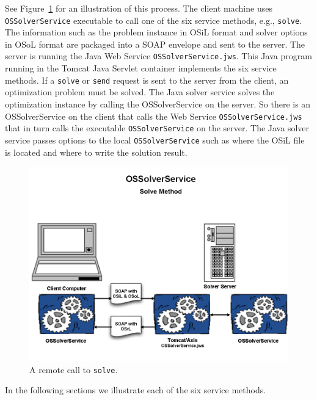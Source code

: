 \documentclass[11pt]{article}
\newcommand{\figurepath}{./figures}
\newcounter{Fig}
\renewcommand{\_}{{\char"5F}}
\renewcommand{\{}{{\char"7B}}
\renewcommand{\}}{{\char"7D}}
\renewcommand{\^}{{\char"0D}}
\renewcommand{\'}{{\char"0D}}
\begin{document}
\begin{enumerate}[Step 1:]
See Figure~\ref{figure:ossolverservice} for an illustration of this process.
The client machine uses {\tt OSSolverService} executable to call one of the
six service methods, e.g., {\tt solve}. The  information such as the problem
instance in OSiL format and solver options in OSoL format are packaged into
a SOAP envelope and sent to the server. The server is running the Java Web
Service {\tt OSSolverService.jws}. This Java program running in the Tomcat
Java Servlet container implements the six service methods. If a {\tt solve}
or {\tt send} request is sent to the server from the client, an optimization
problem must be solved. The Java solver service solves the optimization instance
by  calling the  OSSolverService on the server. So there is an OSSolverService
on the client that calls the Web Service {\tt  OSSolverService.jws} that in turn
calls  the executable {\tt OSSolverService} on the server.
The Java solver service passes options to the local {\tt OSSolverService}
such as where the OSiL file is located and where to write the solution result.

\begin{figure}
\centering
\includegraphics[scale=0.5]{./figures/Figure10.png}
\caption{A remote call to {\tt solve}.}
\label{figure:ossolverservice}
\end{figure}


In the following sections we illustrate each of the six service methods.


\end{enumerate}
\end{document}
